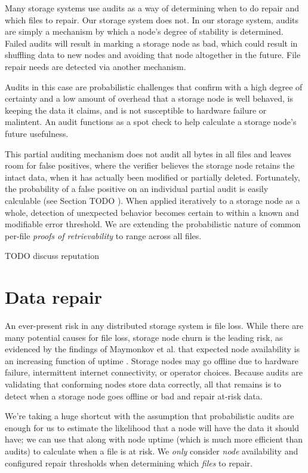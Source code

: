 \documentclass[11pt,fleqn,openany]{book}
\newcommand{\todo}[1]{{\color{red} TODO #1 }}
\begin{document}
Many storage systems use audits as a way of determining when to do repair and
which files to repair. Our storage system does not. In our storage system,
audits are simply a mechanism by which a node's degree of stability is
determined. Failed audits will result in marking a storage node as bad, which
could result in shuffling data to new nodes and avoiding that node altogether
in the future. File repair needs are detected via another mechanism.

Audits in this case are probabilistic challenges that confirm with a high
degree of certainty and a low amount of overhead that a storage node is well
behaved, is keeping the data it claims, and is not susceptible to hardware
failure or malintent. An audit functions as a spot check to help calculate a
storage node's future usefulness.

This partial auditing mechanism does not audit all bytes in all files and
leaves room for false positives, where the verifier believes the storage node
retains the intact data, when it has actually been modified or partially
deleted. Fortunately, the probability of a false positive on an individual
partial audit is easily calculable (see Section \todo{}). When applied
iteratively to a storage node as a whole, detection of unexpected behavior
becomes certain to within a known and modifiable error threshold.
We are extending the probabilistic nature of
common per-file {\em proofs of retrievability} \cite{proof-of-retrievability}
to range across all files.

\todo{discuss reputation}

\section{Data repair}

An ever-present risk in any distributed storage system is file loss. While there
are many potential causes for file loss, storage node churn is the leading
risk, as evidenced by the findings of Maymonkov et al. that expected node
availability is an increasing function of uptime \cite{kad}. Storage nodes
may go offline due to hardware failure, intermittent internet connectivity, or
operator choices.
Because audits are validating that conforming nodes store data correctly, all
that remains is to detect when a storage node goes offline or bad and repair
at-risk data.

We're taking a huge shortcut with the assumption that
probabilistic audits are enough for us to estimate the likelihood that a node
will have the data it should have; we can use that
along with node uptime (which is much more efficient than audits)
to calculate when a file is at risk.
We {\em only} consider {\em node} availability and configured repair thresholds
when determining which {\em files} to repair.
\end{document}
